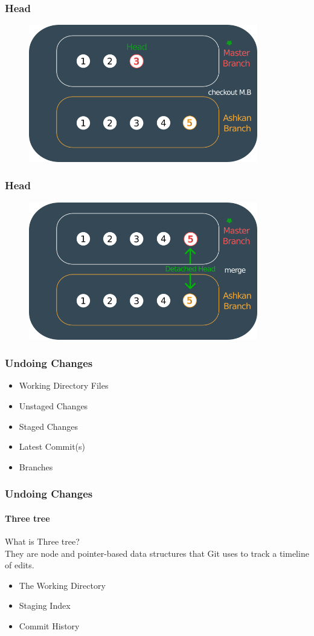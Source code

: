 \documentclass{beamer}
\begin{document}
	\begin{frame}
		\frametitle{Head}
		\begin{figure}[htbp]
			\centering
			\includegraphics[width=10cm]{head15}
		\end{figure}
	\end{frame}
	
	\begin{frame}
		\frametitle{Head}
		\begin{figure}[htbp]
			\centering
			\includegraphics[width=10cm]{head16}
		\end{figure}
	\end{frame}
	
	\begin{frame}
		\frametitle{Undoing Changes}
		\begin{itemize}
			\item Working Directory Files
			\item Unstaged Changes
			\item Staged Changes
			\item Latest Commit(s)
			\item Branches
		\end{itemize}
	\end{frame}
	
	\begin{frame}
	\frametitle{Undoing Changes}
	\framesubtitle{Three tree}
	
	What is \textcolor{secondary}{Three tree}?\\
	They are node and pointer-based data structures that Git uses to track a timeline of edits.\cite{bitbucket}
	
	\begin{itemize}
	\item The Working Directory
	\item Staging Index
	\item Commit History
	\end{itemize}
	
	\end{frame}
\end{document}
